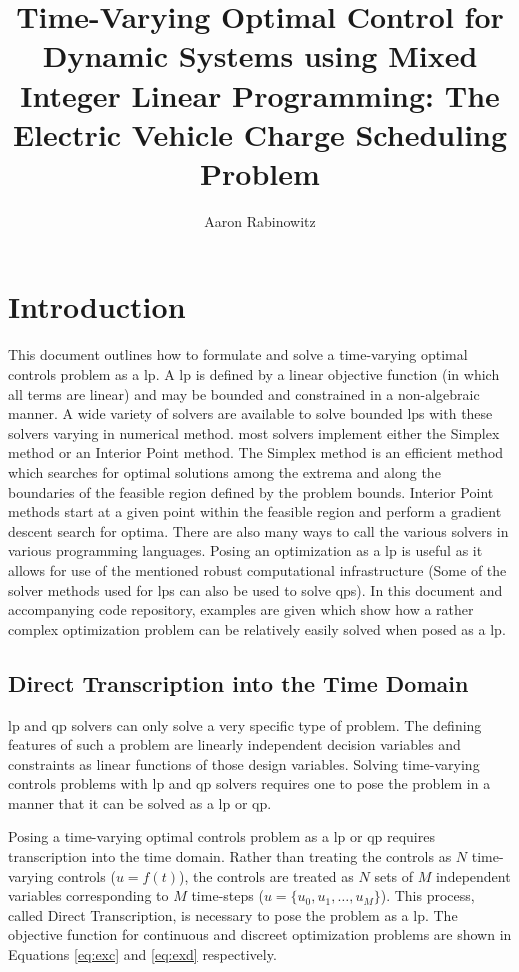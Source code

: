 \documentclass[12pt]{article}
\title{Time-Varying Optimal Control for Dynamic Systems using Mixed Integer Linear Programming: The Electric Vehicle Charge Scheduling Problem}
\author{Aaron Rabinowitz}
\date{}
\begin{document}
\maketitle

\section*{Introduction}

This document outlines how to formulate and solve a time-varying optimal controls problem as a \gls{lp}. A \gls{lp} is defined by a linear objective function (in which all terms are linear) and may be bounded and constrained in a non-algebraic manner. A wide variety of solvers are available to solve bounded \glspl{lp} with these solvers varying in numerical method. most solvers implement either the Simplex method or an Interior Point method. The Simplex method is an efficient method which searches for optimal solutions among the extrema and along the boundaries of the feasible region defined by the problem bounds. Interior Point methods start at a given point within the feasible region and perform a gradient descent search for optima. There are also many ways to call the various solvers in various programming languages. Posing an optimization as a \gls{lp} is useful as it allows for use of the mentioned robust computational infrastructure (Some of the solver methods used for \glspl{lp} can also be used to solve \glspl{qp}). In this document and accompanying code repository, examples are given which show how a rather complex optimization problem can be relatively easily solved when posed as a \gls{lp}.

\subsection*{Direct Transcription into the Time Domain}

\gls{lp} and \gls{qp} solvers can only solve a very specific type of problem. The defining features of such a problem are linearly independent decision variables and constraints as linear functions of those design variables. Solving time-varying controls problems with \gls{lp} and \gls{qp} solvers requires one to pose the problem in a manner that it can be solved as a \gls{lp} or \gls{qp}.

Posing a time-varying optimal controls problem as a \gls{lp} or \gls{qp} requires transcription into the time domain. Rather than treating the controls as $N$ time-varying controls ($u=f(t)$), the controls are treated as $N$ sets of $M$ independent variables corresponding to $M$ time-steps ($u=\{u_0,u_1,\dots,u_M\}$). This process, called Direct Transcription, is necessary to pose the problem as a \gls{lp}. The objective function for  continuous and discreet optimization problems are shown in Equations \eqref{eq:exc} and \eqref{eq:exd} respectively.
\end{document}
